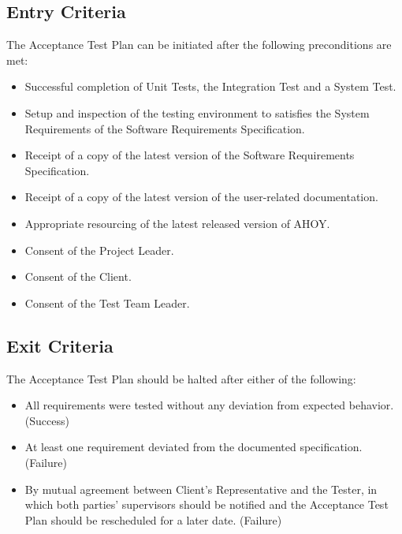\documentclass[titlepage]{article}
\begin{document}
\subsection{Entry Criteria}                                              
    The Acceptance Test Plan can be initiated after the following preconditions are met:
    \begin{itemize}
        \item Successful completion of Unit Tests, the Integration Test and a System Test.
        \item Setup and inspection of the testing environment to satisfies the System Requirements of the Software Requirements Specification.
        \item Receipt of a copy of the latest version of the Software Requirements Specification.
        \item Receipt of a copy of the latest version of the user-related documentation.
        \item Appropriate resourcing of the latest released version of AHOY.
        \item Consent of the Project Leader.
        \item Consent of the Client.
        \item Consent of the Test Team Leader.
    \end{itemize}


\subsection{Exit Criteria}
    The Acceptance Test Plan should be halted after either of the following:
    \begin{itemize}
        \item All requirements were tested without any deviation from expected behavior. (Success)
        \item At least one requirement deviated from the documented specification. (Failure)
        \item By mutual agreement between Client's Representative and the Tester, in which both parties' supervisors should be notified and the Acceptance Test Plan should be rescheduled for a later date. (Failure)
    \end{itemize}

\end{document}
